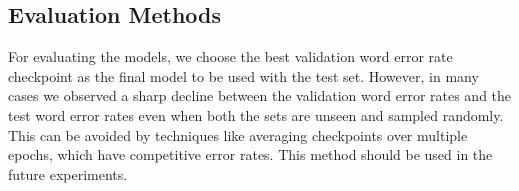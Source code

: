 \subsection{Evaluation Methods}
For evaluating the models, we choose the best validation word error rate checkpoint as the final model to be used with the test set. However, in many cases we observed a sharp decline between the validation word error rates and the test word error rates even when both the sets are unseen and sampled randomly. This can be avoided by techniques like averaging checkpoints over multiple epochs, which have competitive error rates. This method should be used in the future experiments.